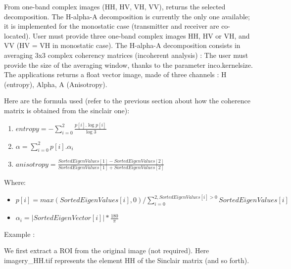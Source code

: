 From one-band complex images (HH, HV, VH, VV), returns the selected decomposition.
The H-alpha-A decomposition is currently the only one available; it is implemented for the monostatic case (transmitter and receiver are co-located).
User must provide three one-band complex images HH, HV or VH, and VV (HV = VH in monostatic case).
The H-alpha-A decomposition consists in averaging 3x3 complex coherency matrices (incoherent analysis) : 
The user must provide the size of the averaging window, thanks to the parameter inco.kernelsize.
The applications returns a float vector image, made of three channels : H (entropy), Alpha, A (Anisotropy).

Here are the formula used (refer to the previous section about how the coherence matrix is obtained from the sinclair one):
\begin{enumerate}
\renewcommand{\labelenumii}{Channel \arabic{enumii} : }
\item $ entropy = -\sum_{i=0}^{2} \frac{p[i].\log{p[i]}}{\log{3}} $
\item $ \alpha = \sum_{i=0}^{2} p[i].\alpha_{i} $
\item $ anisotropy = \frac {SortedEigenValues[1] - SortedEigenValues[2]}{SortedEigenValues[1] + SortedEigenValues[2]} $
\end{enumerate}

Where:
\begin{itemize}
\item $ p[i] = max(SortedEigenValues[i], 0) / \sum_{i=0}^{2, SortedEigenValues[i]>0} SortedEigenValues[i] $
\item $ \alpha_{i} = \left| SortedEigenVector[i] \right|* \frac{180}{\pi}$
\end{itemize}


Example :

We first extract a ROI from the original image (not required). 
Here imagery\_HH.tif represents the element HH of the Sinclair matrix (and so forth).

